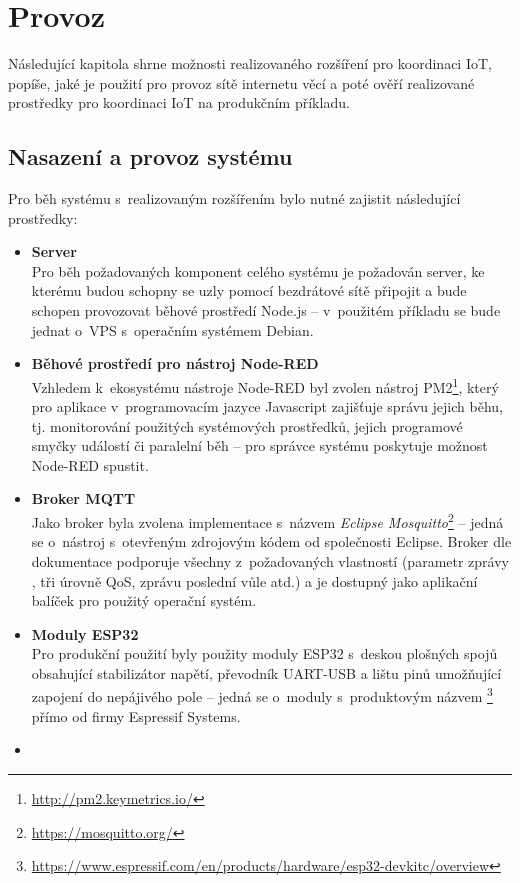 \chapter{Provoz}
\label{ch:provoz}

Následující kapitola shrne možnosti realizovaného rozšíření pro koordinaci IoT, popíše, jaké je použití pro provoz
sítě internetu věcí a poté ověří realizované prostředky pro koordinaci IoT na produkčním příkladu.

\section{Nasazení a provoz systému}\label{sec:nasazení-a-provoz-systému}
Pro běh systému s~realizovaným rozšířením bylo nutné zajistit následující prostředky:
\begin{itemize}
    \item \textbf{Server} \\
    Pro běh požadovaných komponent celého systému je požadován server, ke kterému budou schopny se uzly pomocí
    bezdrátové sítě připojit a bude schopen provozovat běhové prostředí Node.js -- v~použitém příkladu se bude jednat
    o~VPS s~operačním systémem Debian.

    \item \textbf{Běhové prostředí pro nástroj Node-RED} \\
    Vzhledem k~ekosystému nástroje Node-RED byl zvolen nástroj PM2\footnote{\url{http://pm2.keymetrics.io/}}, který pro
    aplikace v~programovacím jazyce Javascript zajišťuje správu jejich běhu, tj. monitorování použitých systémových
    prostředků, jejich programové smyčky událostí či paralelní běh -- pro správce systému poskytuje možnost Node-RED
    spustit.

    \item \textbf{Broker MQTT} \\
    Jako broker byla zvolena implementace s~názvem \emph{Eclipse Mosquitto}\footnote{\url{https://mosquitto.org/}} --
    jedná se o~nástroj s~otevřeným zdrojovým kódem od společnosti Eclipse.
    Broker dle dokumentace podporuje všechny z~požadovaných vlastností (parametr zprávy , tři úrovně QoS,
    zprávu poslední vůle atd.) a je dostupný jako aplikační balíček pro použitý operační systém.

    \item \textbf{Moduly ESP32} \\
    Pro produkční použití byly použity moduly ESP32 s~deskou plošných spojů obsahující stabilizátor napětí, převodník
    UART-USB a lištu pinů umožňující zapojení do nepájivého pole -- jedná se o~moduly s~produktovým názvem
    \footnote{\url{https://www.espressif.com/en/products/hardware/esp32-devkitc/overview}}
    přímo od firmy Espressif Systems.

    \item \textbf{}
\end{itemize}

